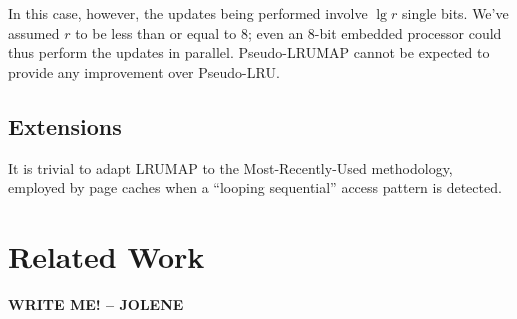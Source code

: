 \documentclass[10pt]{sigplanconf}
\begin{document}
In this case, however, the updates being performed involve $\lg{r}$ single bits.
We've assumed $r$ to be less than or equal to 8; even an 8-bit embedded processor
could thus perform the updates in parallel. Pseudo-LRUMAP cannot be expected to
provide any improvement over Pseudo-LRU.
\subsection{Extensions}
It is trivial to adapt LRUMAP to the Most-Recently-Used methodology, employed
by page caches when a ``looping sequential''\citep{dewitt} access pattern is
detected.
\section{Related Work}
\textbf{WRITE ME! -- JOLENE}


\end{document}
